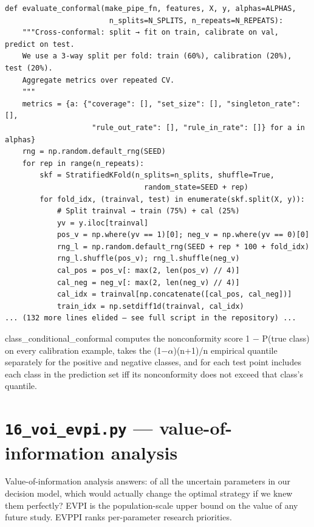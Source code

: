 \documentclass[11pt,a4paper]{article}
\begin{document}
\begin{lstlisting}[style=codeblock]
def evaluate_conformal(make_pipe_fn, features, X, y, alphas=ALPHAS,
                        n_splits=N_SPLITS, n_repeats=N_REPEATS):
    """Cross-conformal: split → fit on train, calibrate on val, predict on test.
    We use a 3-way split per fold: train (60%), calibration (20%), test (20%).
    Aggregate metrics over repeated CV.
    """
    metrics = {a: {"coverage": [], "set_size": [], "singleton_rate": [],
                    "rule_out_rate": [], "rule_in_rate": []} for a in alphas}
    rng = np.random.default_rng(SEED)
    for rep in range(n_repeats):
        skf = StratifiedKFold(n_splits=n_splits, shuffle=True,
                                random_state=SEED + rep)
        for fold_idx, (trainval, test) in enumerate(skf.split(X, y)):
            # Split trainval → train (75%) + cal (25%)
            yv = y.iloc[trainval]
            pos_v = np.where(yv == 1)[0]; neg_v = np.where(yv == 0)[0]
            rng_l = np.random.default_rng(SEED + rep * 100 + fold_idx)
            rng_l.shuffle(pos_v); rng_l.shuffle(neg_v)
            cal_pos = pos_v[: max(2, len(pos_v) // 4)]
            cal_neg = neg_v[: max(2, len(neg_v) // 4)]
            cal_idx = trainval[np.concatenate([cal_pos, cal_neg])]
            train_idx = np.setdiff1d(trainval, cal_idx)
... (132 more lines elided — see full script in the repository) ...
\end{lstlisting}

class\_conditional\_conformal computes the nonconformity score 1 − P(true class) on every calibration example, takes the (1−$\alpha$)(n+1)/n empirical quantile separately for the positive and negative classes, and for each test point includes each class in the prediction set iff its nonconformity does not exceed that class's quantile.
\clearpage
\section{\texttt{16\_voi\_evpi.py} — value-of-information analysis}
Value-of-information analysis answers: of all the uncertain parameters in our decision model, which would actually change the optimal strategy if we knew them perfectly? EVPI is the population-scale upper bound on the value of any future study. EVPPI ranks per-parameter research priorities.
\end{document}
